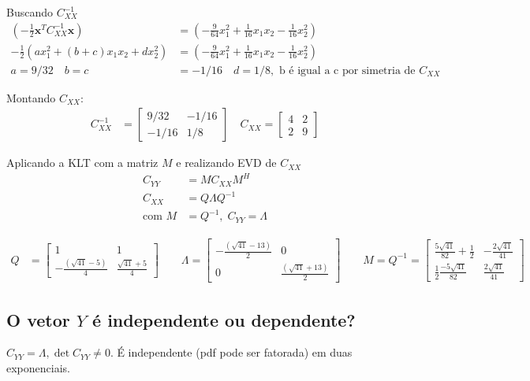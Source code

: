\documentclass{article}
\begin{document}
Buscando $C_{XX}^{-1}$
\begin{align*}
\left(-\frac{1}{2}\mathbf{x}^T C_{XX}^{-1} \mathbf{x}\right) &= \left(-\frac{9}{64}x_1^2+\frac{1}{16}x_1x_2-\frac{1}{16}x_2^2\right)\\
-\frac{1}{2}\left(ax_1^2 + (b+c)x_1x_2 + dx_2^2\right) &= \left(-\frac{9}{64}x_1^2+\frac{1}{16}x_1x_2-\frac{1}{16}x_2^2\right) \\
a = 9/32 \quad b = c  &= -1/16  \quad d = 1/8, \text{ b é igual a c por simetria de } C_{XX}
\end{align*}

Montando $C_{XX}$:
\begin{align*}
    C_{XX}^{-1} &= \begin{bmatrix} 9/32 & -1/16 \\ -1/16 & 1/8 \end{bmatrix} \quad C_{XX} = \begin{bmatrix} 4 & 2 \\ 2 & 9 \end{bmatrix}
\end{align*}

Aplicando a KLT com a matriz $M$ e realizando EVD de $C_{XX}$
\begin{align*}
C_{YY} &= M C_{XX} M^H \\
C_{XX} &= Q \Lambda Q^{-1} \\
\text{com } M &= Q^{-1}, \; C_{YY} = \Lambda
\end{align*}

\begin{align*}
    Q &= \begin{bmatrix} 1 & 1 \\ -\frac{(\sqrt{41}-5)}{4} & \frac{\sqrt{41}+5}{4} \end{bmatrix} \qquad
    \Lambda = \begin{bmatrix} -\frac{(\sqrt{41}-13)}{2} & 0 \\ 0 & \frac{(\sqrt{41}+13)}{2}\end{bmatrix} \qquad
    M = Q^{-1} = \begin{bmatrix} \frac{5\sqrt{41}}{82}+\frac{1}{2} & -\frac{2\sqrt{41}}{41} \\ \frac{1}{2}\frac{-5\sqrt{41}}{82} & \frac{2\sqrt{41}}{41}\end{bmatrix}
\end{align*}

\subsection{O vetor $Y$ é independente ou dependente?}
$C_{YY} = \Lambda, \det{C_{YY}} \neq 0$. É independente (pdf pode ser fatorada) em duas
exponenciais.
\end{document}
